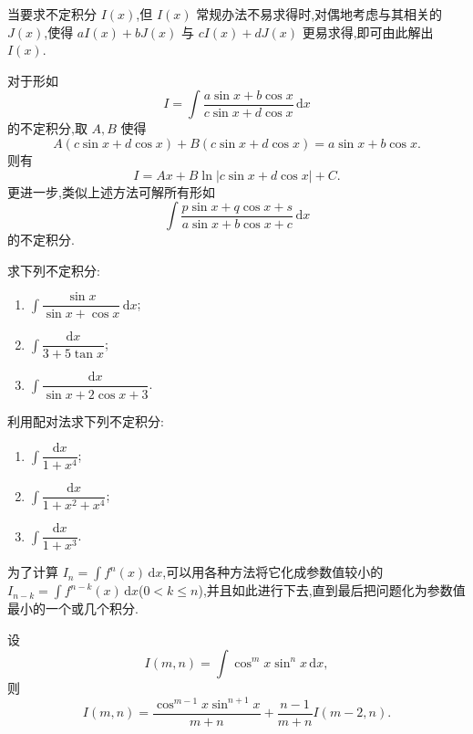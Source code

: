 \documentclass[../数学分析培优讲义.tex]{subfiles}
\begin{document}

当要求不定积分 $I(x)$,但 $I(x)$ 常规办法不易求得时,对偶地考虑与其相关的 $J(x)$,使得 $aI(x)+bJ(x)$ 与 $cI(x)+dJ(x)$ 更易求得,即可由此解出 $I(x)$.

\begin{proposition}[\markstar]
对于形如
\[
    I=\int\dfrac{a\sin x+b\cos x}{c\sin x+d\cos x}\,\mathrm{d}x
\]
的不定积分,取 $A,B$ 使得
\[
    A(c\sin x+d\cos x)+B(c\sin x+d\cos x)
    =a\sin x+b\cos x.
\]
则有
\[
    I=Ax+B\ln|c\sin x+d\cos x|+C.
\]
更进一步,类似上述方法可解所有形如
\[
    \int\dfrac{p\sin x+q\cos x+s}{a\sin x+b\cos x+c}\,\mathrm{d}x
\]
的不定积分.
\end{proposition}

\begin{example}
求下列不定积分:
\begin{enumerate}[label=(\arabic*)]
    \item $\displaystyle\int\dfrac{\sin x}{\sin x+\cos x}\,\mathrm{d}x$;
    \item $\displaystyle\int\dfrac{\mathrm{d}x}{3+5\tan x}$;
    \item $\displaystyle\int\dfrac{\mathrm{d}x}{\sin x+2\cos x+3}$.
\end{enumerate}
\end{example}
\exampleblank

\begin{example}
利用配对法求下列不定积分:
\begin{enumerate}[label=(\arabic*)]
    \item $\displaystyle\int\dfrac{\mathrm{d}x}{1+x^4}$;
    \item $\displaystyle\int\dfrac{\mathrm{d}x}{1+x^2+x^4}$;
    \item $\displaystyle\int\dfrac{\mathrm{d}x}{1+x^3}$.
\end{enumerate}
\end{example}
\exampleblank


\newpage


为了计算 $\displaystyle I_n=\int f^n(x)\,\mathrm{d}x$,可以用各种方法将它化成参数值较小的 $\displaystyle I_{n-k}=\int f^{n-k}(x)\,\mathrm{d}x$($0<k\leq n$),并且如此进行下去,直到最后把问题化为参数值最小的一个或几个积分.

\begin{proposition}[\markstar]
设
\[
    I(m,n)=\int\cos^m x\sin^n x\,\mathrm{d}x,
\]
则
\[
    I(m,n)
    =\dfrac{\cos^{m-1}x\sin^{n+1}x}{m+n}
    +\dfrac{n-1}{m+n}I(m-2,n).
\]
\end{proposition}
\end{document}
